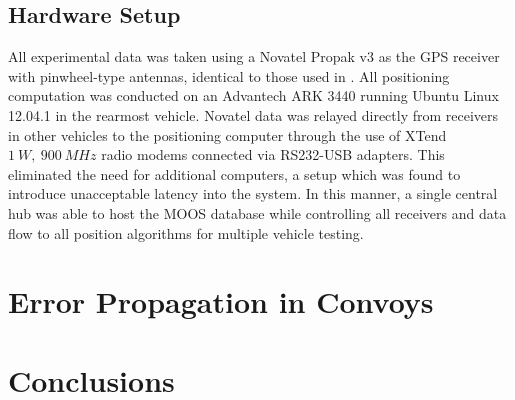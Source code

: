 \documentclass[12pt]{report}
\begin{document}
\section{Hardware Setup}
\label{sec:hardware}
All experimental data was taken using a Novatel Propak v3 as the GPS receiver with pinwheel-type antennas, identical to those used in \cite{scottthesis}. All positioning computation was conducted on an Advantech ARK 3440 running Ubuntu Linux 12.04.1 in the rearmost vehicle. Novatel data was relayed directly from receivers in other vehicles to the positioning computer through the use of XTend $1~W,~900~MHz$ radio modems connected via RS232-USB adapters. This eliminated the need for additional computers, a setup which was found to introduce unacceptable latency into the system. In this manner, a single central hub was able to host the MOOS database while controlling all receivers and data flow to all position algorithms for multiple vehicle testing.

\chapter{Error Propagation in Convoys}
\label{chap:errprop}


\chapter{Conclusions}





\nocite{travisdiss}
\nocite{travisshort}
\nocite{calgary}

\end{document}
